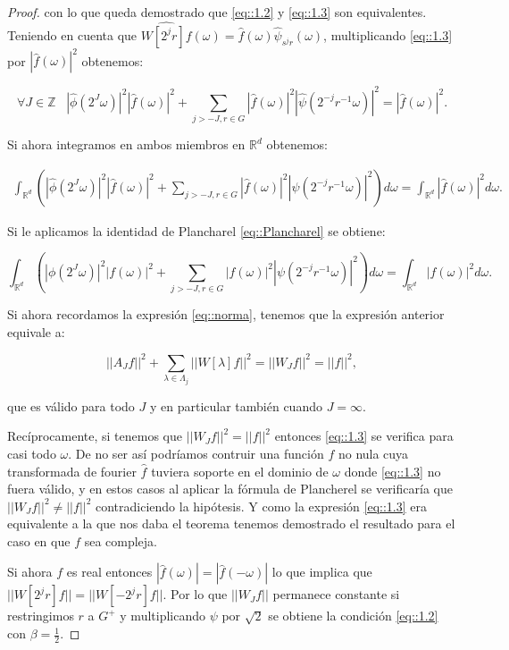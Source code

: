 \begin{proof}
\noindent con lo que queda demostrado que \eqref{eq::1.2} y \eqref{eq::1.3} son equivalentes. Teniendo en cuenta que $\widehat{W\left[2^jr\right]f}(\omega)=\widehat{f}(\omega)\widehat{\psi}_{s^jr}(\omega)$, multiplicando \eqref{eq::1.3} por $|\widehat{f}(\omega)|^2$ obtenemos: 

$$\forall J \in \mathbb{Z} \; \; \; \left|\widehat{\phi}\left(2^J\omega\right)\right|^2 \left|\widehat{f}(\omega)\right|^2 + \sum_{j>-J,r\in G}\left|\widehat{f}(\omega)\right|^2\left|\widehat{\psi}\left(2^{-j}r^{-1}\omega\right)\right|^2=\left|\widehat{f}(\omega)\right|^2.$$

\noindent Si ahora integramos en ambos miembros en $\mathbb{R}^d$ obtenemos: 

     \begin{align*}
        \int_{\mathbb{R}^d}\left(\left|\widehat{\phi}\left(2^J\omega\right)\right|^2 \left|\widehat{f}(\omega)\right|^2 + \sum_{j>-J,r\in G}\left|\widehat{f}(\omega)\right|^2\left|\widehat{\psi}\left(2^{-j}r^{-1}\omega\right)\right|^2 \right) d\omega=\int_{\mathbb{R}^d}\left|\widehat{f}(\omega)\right|^2 d\omega.
    \end{align*}

\noindent Si le aplicamos la identidad de Plancharel \eqref{eq::Plancharel} se obtiene:

$$\int_{\mathbb{R}^d}\left(\left|\phi\left(2^J\omega\right)\right|^2 \left|f(\omega)\right|^2 + \sum_{j>-J,r\in G}\left|f(\omega)\right|^2\left|\psi\left(2^{-j}r^{-1}\omega\right)\right|^2 \right) d\omega=\int_{\mathbb{R}^d}\left|f(\omega)\right|^2 d\omega.$$

\noindent Si ahora recordamos la expresión \eqref{eq::norma}, tenemos que la expresión anterior equivale a:

$$||A_Jf||^2+\sum_{\lambda \in \Lambda_j} ||W[\lambda]f||^2=||W_J f||^2=||f||^2,$$

\noindent que es válido para todo $J$ y en particular también cuando $J=\infty$.

\medskip

\noindent Recíprocamente, si tenemos que $||W_J f||^2=||f||^2$ entonces \eqref{eq::1.3} se verifica para casi todo $\omega$. De no ser así podríamos contruir una función $f$ no nula cuya transformada de fourier $\widehat{f}$ tuviera soporte en el dominio de $\omega$ donde \eqref{eq::1.3} no fuera válido, y en estos casos al aplicar la fórmula de Plancherel se verificaría que $||W_J f||^2 \neq ||f||^2$ contradiciendo la hipótesis. Y como la expresión \eqref{eq::1.3} era equivalente a la que nos daba el teorema tenemos demostrado el resultado para el caso en que $f$ sea compleja. 

\medskip

\noindent Si ahora $f$ es real entonces $|\widehat{f}(\omega)|=|\widehat{f}(-\omega)|$ lo que implica que $||W[2^jr]f||=||W[-2^jr]f||$. Por lo que $||W_J f||$ permanece constante si restringimos $r$ a $G^+$ y multiplicando $\psi$ por $\sqrt{2}$ se obtiene la condición \eqref{eq::1.2} con $\beta=\frac{1}{2}$. \qedhere

\end{proof}

